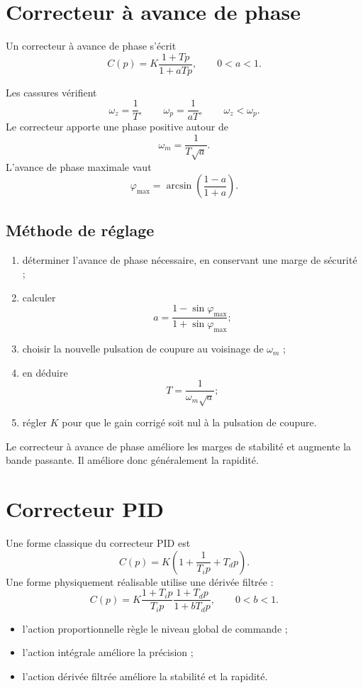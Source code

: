 \section{Correcteur à avance de phase}\label{sec:corr-avance}

Un correcteur à avance de phase s'écrit
\[
\boxed{C(p)=K\frac{1+Tp}{1+aTp}},\qquad 0<a<1.
\]

\TLBodeAvancePhase[1][0.1][1]

Les cassures vérifient
\[
\omega_z=\frac{1}{T},\qquad \omega_p=\frac{1}{aT},
\qquad \omega_z<\omega_p.
\]
Le correcteur apporte une phase positive autour de
\[
\omega_m=\frac{1}{T\sqrt a}.
\]
L'avance de phase maximale vaut
\[
\varphi_{\max}=\arcsin\left(\frac{1-a}{1+a}\right).
\]

\subsection{Méthode de réglage}

\begin{enumerate}
  \item déterminer l'avance de phase nécessaire, en conservant une marge de sécurité ;
  \item calculer
  \[
  a=\frac{1-\sin\varphi_{\max}}{1+\sin\varphi_{\max}} ;
  \]
  \item choisir la nouvelle pulsation de coupure au voisinage de $\omega_m$ ;
  \item en déduire
  \[
  T=\frac{1}{\omega_m\sqrt a} ;
  \]
  \item régler $K$ pour que le gain corrigé soit nul à la pulsation de coupure.
\end{enumerate}

Le correcteur à avance de phase améliore les marges de stabilité et augmente la
bande passante. Il améliore donc généralement la rapidité.

\section{Correcteur PID}\label{sec:corr-pid}

Une forme classique du correcteur PID est
\[
\boxed{C(p)=K\left(1+\frac{1}{T_i p}+T_d p\right)}.
\]
Une forme physiquement réalisable utilise une dérivée filtrée :
\[
\boxed{C(p)=K\frac{1+T_i p}{T_i p}\frac{1+T_d p}{1+bT_d p}},
\qquad 0<b<1.
\]

\TLBodeCorrecteurPID[1][10][1][0.1]

\begin{itemize}
  \item l'action proportionnelle règle le niveau global de commande ;
  \item l'action intégrale améliore la précision ;
  \item l'action dérivée filtrée améliore la stabilité et la rapidité.
\end{itemize}

